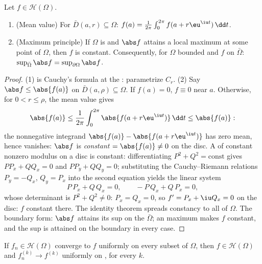 \begin{theorem}
\label{thm:b3:holomorphic:maximum}
Let $f \in \mathcal H(\Omega)$.
\begin{enumerate}
  \item (Mean value) For $\bar D(a, r) \subseteq \Omega$:
        $f(a) = \frac1{2\pi}\int_0^{2\pi}f(a +
        r\eu^{\iu t})\,\dd t$.
  \item (Maximum principle) If $\Omega$ is  and
        $\abs f$ attains a local maximum at some point of
        $\Omega$, then $f$ is constant. Consequently, for
        $\Omega$ bounded and $f$  on
        $\bar\Omega$: $\sup_{\bar\Omega}\abs f =
        \sup_{\partial\Omega}\abs f$.
\end{enumerate}
\end{theorem}

\begin{proof}
(1) is Cauchy's formula at the : parametrize $C_r$.
(2) Say $\abs f \leq \abs{f(a)}$ on $\bar D(a, \rho)
\subseteq \Omega$. If $f(a) = 0$, $f \equiv 0$ near $a$.
Otherwise, for $0 < r \leq \rho$, the mean value gives
\[
\abs{f(a)} \leq \frac1{2\pi}\int_0^{2\pi}\abs{f(a +
r\eu^{\iu t})}\,\dd t \leq \abs{f(a)} :
\]
the  nonnegative integrand $\abs{f(a)} - \abs{f(a +
r\eu^{\iu t})}$ has zero mean, hence vanishes: $\abs f$ is
\emph{constant} $= \abs{f(a)} \ne 0$ on the disc. A  of constant nonzero modulus on a disc is constant:
differentiating $P^2 + Q^2 = \text{const}$ gives $PP_x + QQ_x
= 0$ and $PP_y + QQ_y = 0$; substituting the Cauchy--Riemann
relations $P_y = -Q_x$, $Q_y = P_x$ into the second equation
yields the linear system
\[
P\,P_x + Q\,Q_x = 0, \qquad -P\,Q_x + Q\,P_x = 0,
\]
whose determinant is $P^2 + Q^2 \neq 0$: $P_x = Q_x = 0$, so
$f' = P_x + \iu Q_x = 0$ on the disc: $f$ constant there. The
identity theorem spreads constancy to all of $\Omega$. The boundary form: $\abs f$
attains its sup on the  $\bar\Omega$; an 
maximum makes $f$ constant, and the sup is attained on the
boundary in every case.
\end{proof}

\begin{theorem}
\label{thm:b3:holomorphic:weierstrassconv}
If $f_n \in \mathcal H(\Omega)$ converge to $f$ uniformly on
every  subset of $\Omega$, then $f \in \mathcal
H(\Omega)$ and $f_n^{(k)} \to f^{(k)}$ uniformly on ,
for every $k$.
\end{theorem}

